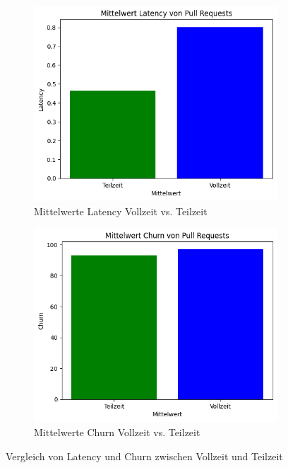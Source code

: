 \begin{figure}[ht]
    \centering
    \begin{subfigure}[b]{0.48\textwidth}
        \centering
        \includegraphics[width=\textwidth]{Figures/mittelwert-latency-t-v.png}
        \caption{Mittelwerte Latency Vollzeit vs. Teilzeit}
        \label{fig:mittelwert-latency-t-v}
    \end{subfigure}
    \hfill
    \begin{subfigure}[b]{0.48\textwidth}
        \centering
        \includegraphics[width=\textwidth]{Figures/mittelwert-churn-t-v.png}
        \caption{Mittelwerte Churn Vollzeit vs. Teilzeit}
        \label{fig:mittelwert-churn-t-v}
    \end{subfigure}
    \caption{Vergleich von Latency und Churn zwischen Vollzeit und Teilzeit}
    \label{fig:vergleich-latency-churn}
\end{figure}

